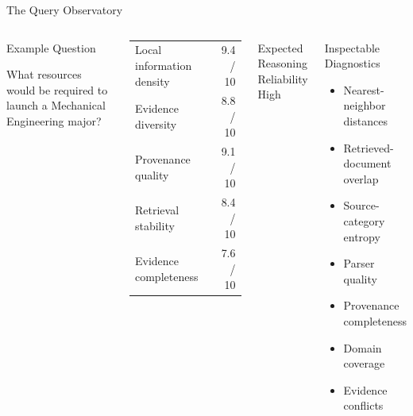 \documentclass[aspectratio=169]{beamer}
\begin{document}
\begin{frame}{The Query Observatory}

\small

\begin{columns}[T]


\begin{block}{Example Question}

What resources would be required to launch a Mechanical Engineering
major?

\end{block}

\vspace{0.2cm}

\begin{tabular}{lr}

Local information density & 9.4 / 10 \\

Evidence diversity & 8.8 / 10 \\

Provenance quality & 9.1 / 10 \\

Retrieval stability & 8.4 / 10 \\

Evidence completeness & 7.6 / 10 \\

\end{tabular}

\vspace{0.4cm}

\begin{alertblock}{Expected Reasoning Reliability}
High
\end{alertblock}


\begin{block}{Inspectable Diagnostics}

\begin{itemize}
\item Nearest-neighbor distances
\item Retrieved-document overlap
\item Source-category entropy
\item Parser quality
\item Provenance completeness
\item Domain coverage
\item Evidence conflicts
\end{itemize}

\end{block}

\end{columns}

\end{frame}
\end{document}
